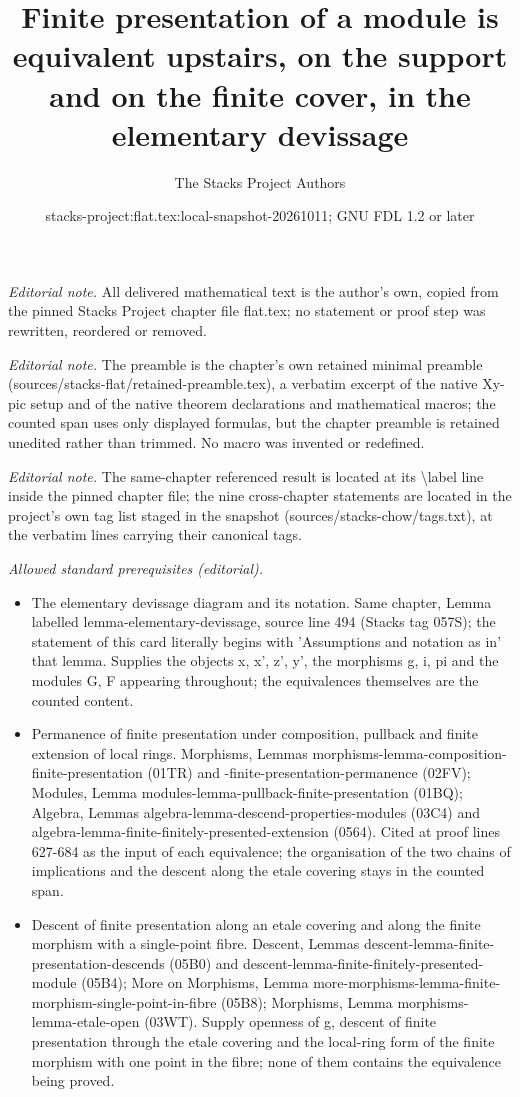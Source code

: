 \documentclass[10pt,a4paper]{amsart}
\title{Finite presentation of a module is equivalent upstairs, on the support and on the finite cover, in the elementary devissage}
\author{The Stacks Project Authors}
\date{stacks-project:flat.tex:local-snapshot-20261011; GNU FDL 1.2 or later}
\theoremstyle{plain}
\theoremstyle{definition}
\theoremstyle{remark}
\numberwithin{equation}{subsection}
\begin{document}
\maketitle
\noindent\textit{Editorial note.} All delivered mathematical text is the author's own, copied from the pinned Stacks Project chapter file flat.tex; no statement or proof step was rewritten, reordered or removed.\par\medskip
\noindent\textit{Editorial note.} The preamble is the chapter's own retained minimal preamble (sources/stacks-flat/retained-preamble.tex), a verbatim excerpt of the native Xy-pic setup and of the native theorem declarations and mathematical macros; the counted span uses only displayed formulas, but the chapter preamble is retained unedited rather than trimmed. No macro was invented or redefined.\par\medskip
\noindent\textit{Editorial note.} The same-chapter referenced result is located at its \textbackslash{}label line inside the pinned chapter file; the nine cross-chapter statements are located in the project's own tag list staged in the snapshot (sources/stacks-chow/tags.txt), at the verbatim lines carrying their canonical tags.\par\medskip
\noindent\textit{Allowed standard prerequisites (editorial).}\begin{itemize}
\item The elementary devissage diagram and its notation. Same chapter, Lemma labelled lemma-elementary-devissage, source line 494 (Stacks tag 057S); the statement of this card literally begins with 'Assumptions and notation as in' that lemma. Supplies the objects x, x', z', y', the morphisms g, i, pi and the modules G, F appearing throughout; the equivalences themselves are the counted content.
\item Permanence of finite presentation under composition, pullback and finite extension of local rings. Morphisms, Lemmas morphisms-lemma-composition-finite-presentation (01TR) and -finite-presentation-permanence (02FV); Modules, Lemma modules-lemma-pullback-finite-presentation (01BQ); Algebra, Lemmas algebra-lemma-descend-properties-modules (03C4) and algebra-lemma-finite-finitely-presented-extension (0564). Cited at proof lines 627-684 as the input of each equivalence; the organisation of the two chains of implications and the descent along the etale covering stays in the counted span.
\item Descent of finite presentation along an etale covering and along the finite morphism with a single-point fibre. Descent, Lemmas descent-lemma-finite-presentation-descends (05B0) and descent-lemma-finite-finitely-presented-module (05B4); More on Morphisms, Lemma more-morphisms-lemma-finite-morphism-single-point-in-fibre (05B8); Morphisms, Lemma morphisms-lemma-etale-open (03WT). Supply openness of g, descent of finite presentation through the etale covering and the local-ring form of the finite morphism with one point in the fibre; none of them contains the equivalence being proved.
\end{itemize}\medskip
\end{document}
